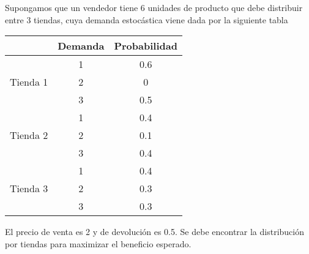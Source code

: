 \documentclass[MIOP.tex]{subfiles}
\begin{document}
\begin{ej}
Supongamos que un vendedor tiene 6 unidades de producto que debe distribuir entre 3 tiendas, cuya demanda estocástica viene dada por la siguiente tabla
\begin{center}
\begin{tabular}{|c|c|c|}
\hline
 & Demanda & Probabilidad\\
\hline
 	& 1 & 0.6\\
Tienda 1         & 2 & 0\\
         & 3 & 0.5\\
         \hline
 & 1 & 0.4      \\
 Tienda 2 & 2 & 0.1\\
          & 3 & 0.4\\
          \hline  
          & 1 & 0.4\\
  Tienda 3 & 2 & 0.3\\
  & 3 & 0.3\\
  \hline
\end{tabular}
\end{center}

El precio de venta es 2 y de devolución es 0.5. Se debe encontrar la distribución por tiendas para maximizar el beneficio esperado.


\end{ej}
\end{document}
